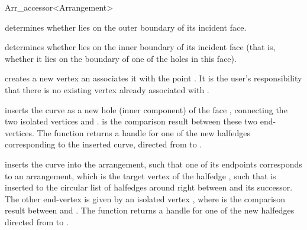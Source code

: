 \begin{ccRefClass}{Arr_accessor<Arrangement>}
\begin{ccAdvanced}
    {determines whether  lies on the outer boundary of its incident
     face.}

    {determines whether  lies on the inner boundary of its incident
     face (that is, whether it lies on the boundary of one of the holes
     in this face).}


    {creates a new vertex an associates it with the point .
     It is the user's responsibility that there is no existing vertex already
     associated with .}

   {inserts the curve  as a new hole (inner component) of the face
    , connecting the two isolated vertices  and .
     is the comparison result between these two end-vertices.
    The function returns a handle for one of the new halfedges
    corresponding to the inserted curve, directed from  to .
    }

  {inserts the curve  into the arrangement, such that one of its
   endpoints corresponds to an arrangement, which is the
   target vertex of the halfedge , such that  is inserted
   to the circular list of halfedges around  right
   between  and its successor. The other end-vertex is given by
   an isolated vertex ,
   where  is the comparison result between  and .
   The function returns a handle for one of the new halfedges directed from
    to .
   }


\end{ccAdvanced}
\end{ccRefClass}
